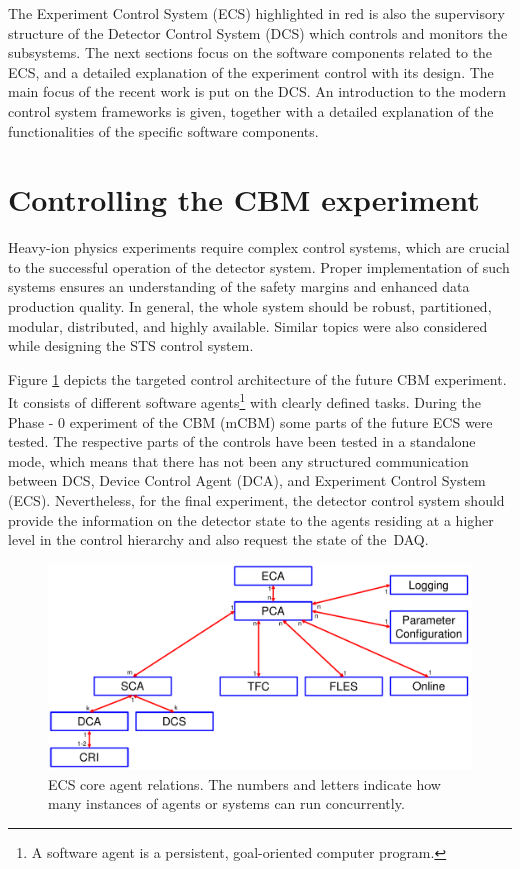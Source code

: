 \newpage 
The Experiment Control System (\gls{ECS}) highlighted in red is also the supervisory structure of the Detector Control System (\gls{DCS}) which controls and monitors the subsystems. The next sections focus on the software components related to the \gls{ECS}, and a detailed explanation of the experiment control with its design. The main focus of the recent work is put on the \gls{DCS}. An introduction to the modern control system frameworks is given, together with a detailed explanation of the functionalities of the specific software components. 
\section{Controlling the CBM experiment}

Heavy-ion physics experiments require complex control systems, which are crucial to the successful operation of the detector system. Proper implementation of such systems ensures an understanding of the safety margins and enhanced data production quality. In general, the whole system should be robust, partitioned, modular, distributed, and highly available. Similar topics were also considered while designing the \gls{STS} control system.

Figure \ref{fig_sim} depicts the targeted control architecture of the future \gls{CBM} experiment. It consists of different software agents\footnote{A software agent is a persistent, goal-oriented computer program.} with clearly defined tasks. During the Phase - 0 experiment of the \gls{CBM} (\gls{mCBM}) some parts of the future \gls{ECS} were tested. The respective parts of the controls have been tested in a standalone mode, which means that there has not been any structured communication between \gls{DCS}, Device Control Agent (\gls{DCA}), and Experiment Control System (\gls{ECS}). Nevertheless, for the final experiment, the detector control system should provide the information on the detector state to the agents residing at a higher level in the control hierarchy and also request the state of the~\gls{DAQ}.

\begin{figure}[!h]
\centering
\includegraphics[width=0.8\columnwidth]{Chapter3/Controls/images/AgentsRelations_V2.pdf}
\caption{\gls{ECS} core agent relations. The numbers and letters indicate how many instances of agents or systems can run concurrently.}
\label{fig_sim}
\end{figure}

